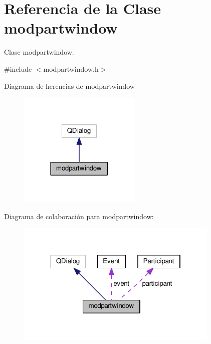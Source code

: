 \hypertarget{classmodpartwindow}{}\section{Referencia de la Clase modpartwindow}
\label{classmodpartwindow}


Clase modpartwindow.  




{\ttfamily \#include $<$modpartwindow.\+h$>$}



Diagrama de herencias de modpartwindow\nopagebreak
\begin{figure}[H]
\begin{center}
\leavevmode
\includegraphics[width=165pt]{classmodpartwindow__inherit__graph}
\end{center}
\end{figure}


Diagrama de colaboración para modpartwindow\+:\nopagebreak
\begin{figure}[H]
\begin{center}
\leavevmode
\includegraphics[width=274pt]{classmodpartwindow__coll__graph}
\end{center}
\end{figure}
